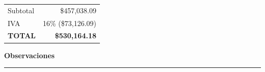 \documentclass[11pt,a4paper]{article}
\begin{document}
\vspace{4mm}
\begin{flushright}
  \begin{tabular}{@{} l r @{}}
    \toprule
    Subtotal       & \$457,038.09\\
    IVA            & 16\% (\$73,126.09)\\
    \midrule
    \textbf{TOTAL} & \textbf{\$530,164.18}\\
    \bottomrule
  \end{tabular}
\end{flushright}

\vspace{5mm}
{\Large\textbf{Observaciones}}



\vfill
\begin{center}
  \rule{7cm}{0.4pt}\\
  
\end{center}
\end{document}
